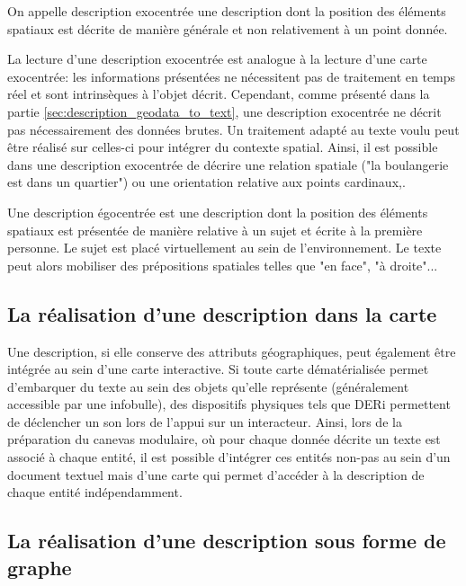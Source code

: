 \label{sec:description_textuelle}

On appelle description exocentrée une description dont la position des éléments spatiaux est décrite de manière générale et non relativement à un point donnée.

La lecture d'une description exocentrée est analogue à la lecture d'une carte exocentrée: les informations présentées ne nécessitent pas de traitement en temps réel et sont intrinsèques à l'objet décrit. Cependant, comme présenté dans la partie \ref{sec:description_geodata_to_text}, une description exocentrée ne décrit pas nécessairement des données brutes. Un traitement adapté au texte voulu peut être réalisé sur celles-ci pour intégrer du contexte spatial. Ainsi, il est possible dans une description exocentrée de décrire une relation spatiale ("la boulangerie est dans un quartier") ou une orientation relative aux points cardinaux,.

\newpar{}

Une description égocentrée est une description dont la position des éléments spatiaux est présentée de manière relative à un sujet et écrite à la première personne. Le sujet est placé virtuellement au sein de l'environnement. Le texte peut alors mobiliser des prépositions spatiales telles que "en face", "à droite"...

\subsection{La réalisation d'une description dans la carte}

\label{sec:description_carte}

Une description, si elle conserve des attributs géographiques, peut également être intégrée au sein d'une carte interactive. Si toute carte dématérialisée permet d'embarquer du texte au sein des objets qu'elle représente (généralement accessible par une infobulle), des dispositifs physiques tels que DERi \missref{} permettent de déclencher un son lors de l'appui sur un interacteur. Ainsi, lors de la préparation du canevas modulaire, où pour chaque donnée décrite un texte est associé à chaque entité, il est possible d'intégrer ces entités non-pas au sein d'un document textuel mais d'une carte qui permet d'accéder à la description de chaque entité indépendamment.

\subsection{La réalisation d'une description sous forme de graphe}

